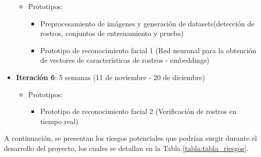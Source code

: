 \begin{itemize}
\begin{itemize}
			\item Prototipos:
			\begin{itemize}
				\item Preprocesamiento de imágenes y generación de datasets(detección de rostros, conjuntos de entrenamiento y prueba)
				\item Prototipo de reconocimiento facial 1 (Red neuronal para la obtención de vectores de características de rostros - embeddings)
			\end{itemize}

		\end{itemize}
		
		\item \textbf{Iteración 6}: 5 semanas (11 de noviembre -  20 de diciembre)
		\begin{itemize}
			\item Prototipos:
			\begin{itemize}
				\item Prototipo de reconocimiento facial 2 (Verificación de rostros en tiempo real)
			\end{itemize}
		\end{itemize}
	\end{itemize}
	
	A continuación, se presentan los riesgos potenciales que podrían surgir durante el desarrollo del proyecto, los cuales se detallan en la Tabla \ref{tabla:tabla_riesgos}.

